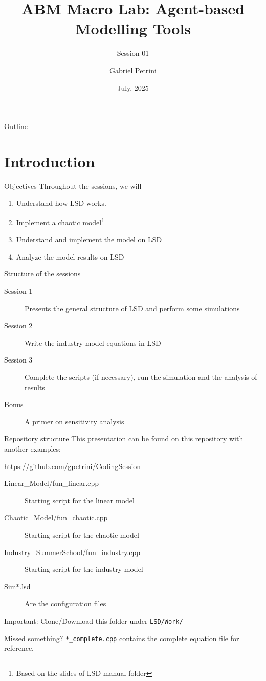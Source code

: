 \documentclass[bigger,aspectratio=169]{beamer}
\author{Gabriel Petrini}
\date{July, 2025}
\title{ABM Macro Lab: Agent-based Modelling Tools}
\subtitle{Session 01}
\begin{document}
\maketitle
\begin{frame}{Outline}
\tableofcontents
\end{frame}

\section{Introduction}
\label{sec:orge93aaec}

\begin{frame}[label={sec:orgcc5503d}]{Objectives}
Throughout the sessions, we will

\begin{enumerate}
\item Understand how LSD works.
\item Implement a chaotic model\footnote{Based on the slides of LSD manual folder}
\item Understand and implement the \textcite{dosi_2017_footprint} model on LSD
\item Analyze the model results on LSD
\end{enumerate}
\end{frame}
\begin{frame}[label={sec:orgf20f731}]{Structure of the sessions}
\begin{description}
\item[{Session 1}] Presents the general structure of LSD and perform some simulations
\item[{Session 2}] Write the industry model equations in LSD
\item[{Session 3}] Complete the scripts (if necessary), run the simulation and the analysis of results
\item[{Bonus}] A primer on sensitivity analysis
\end{description}
\end{frame}
\begin{frame}[label={sec:org9fee14a},fragile]{Repository structure}
 This presentation can be found on this \href{https://github.com/gpetrini/CodingSession}{repository} with another examples:

\url{https://github.com/gpetrini/CodingSession}

\begin{description}
\item[{Linear\_Model/fun\_linear.cpp}] Starting script for the linear model
\item[{Chaotic\_Model/fun\_chaotic.cpp}] Starting script for the chaotic model
\item[{Industry\_SummerSchool/fun\_industry.cpp}] Starting script for the industry model
\item[{Sim*.lsd}] Are the configuration files
\end{description}

\alert{Important:} Clone/Download this folder under \texttt{LSD/Work/}
\begin{block}{Missed something?}
\texttt{*\_complete.cpp} contains the complete equation file for reference.
\end{block}
\end{frame}
\end{document}
